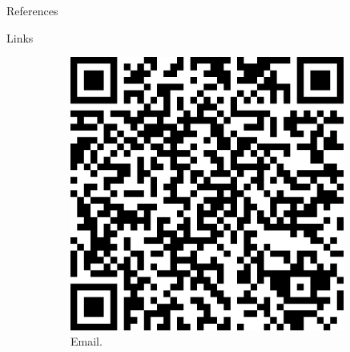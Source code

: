 \documentclass[20pt]{beamer}
\begin{document}
\begin{frame}[fragile,t]
\begin{columns}[t]
\begin{column}{0.33\linewidth}
\vspace{1cm}

    \begin{block}{References\vphantom{g}}
        {\small


        }
    \end{block}

\vspace{0.5cm}

    \begin{block}{Links}
\begin{figure}
    \begin{subfigure}[b]{0.2\textwidth}
\includegraphics[width=0.99\textwidth]{images/qrcode_email_alber_ipia_at_inpe.png} \\
\centering
{Email.}
    \end{subfigure}
    ~
    \begin{subfigure}[b]{0.2\textwidth}

\end{subfigure}
\end{figure}
\end{block}
\end{column}
\end{columns}
\end{frame}
\end{document}
